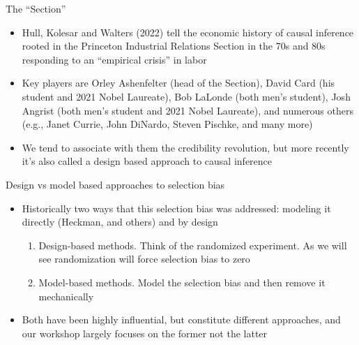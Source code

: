 \documentclass{beamer}
\begin{document}
\begin{frame}{The ``Section''}

\begin{itemize}

	\item Hull, Kolesar and Walters (2022) tell the economic history of causal inference rooted in the Princeton Industrial Relations Section in the 70s and 80s responding to an ``empirical crisis'' in labor
	\item Key players are Orley Ashenfelter (head of the Section), David Card (his student and 2021 Nobel Laureate), Bob LaLonde (both men's student), Josh Angrist (both men's student and 2021 Nobel Laureate), and numerous others (e.g., Janet Currie, John DiNardo, Steven Pischke, and many more)
	\item We tend to associate with them the credibility revolution, but more recently it's also called a design based approach to causal inference


\end{itemize}

\end{frame}

\begin{frame}{Design vs model based approaches to selection bias}

\begin{itemize}

\item Historically two ways that this selection bias was addressed: modeling it directly (Heckman, and others) and by design
	\begin{enumerate}
	\item Design-based methods.  Think of the randomized experiment.  As we will see randomization will force selection bias to zero
	\item Model-based methods.  Model the selection bias and then remove it mechanically
	\end{enumerate}
\item Both have been highly influential, but constitute different approaches, and our workshop largely focuses on the former not the latter

\end{itemize}

\end{frame}
\end{document}

